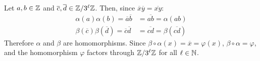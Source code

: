 \documentclass{article}
\begin{document}
Let $a, b \in \mathbb{Z}$ and $\overline{c}, \overline{d} \in \mathbb{Z}/3^\ell\mathbb{Z}$. Then, since $\overline{x}\overline{y} = \overline{xy}$:
\begin{equation}
    \begin{split}
        \alpha\left(a\right)\alpha\left(b\right) = \overline{a}\overline{b} & = \overline{ab} = \alpha\left(ab\right) \\
        \beta\left(\overline{c}\right)\beta\left(\overline{d}\right) = \overline{c}\overline{d} & = \overline{cd} = \beta\left(\overline{cd}\right)
    \end{split}
\end{equation}
Therefore $\alpha$ and $\beta$ are homomorphisms. Since $\beta \circ \alpha \left(x\right) = \overline{x} = \varphi\left(x\right)$, $\beta \circ \alpha = \varphi$, and the homomorphism $\varphi$ factors through $\mathbb{Z}/3^\ell\mathbb{Z}$ for all $\ell \in \mathbb{N}$.
\end{document}
